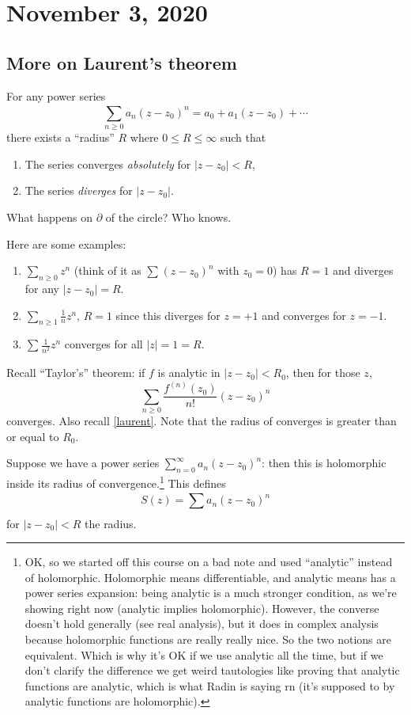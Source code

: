 \section{November 3, 2020}
\subsection{More on Laurent's theorem}
\begin{theorem}
    For any power series \[
        \sum_{n\geq 0}^{} a_n (z-z_0)^n =a_0+a_1(z-z_0)+\cdots 
    \] there exists a ``radius'' $R$ where $0\leq R\leq \infty$ such that 
    \begin{enumerate}
        \item The series converges \emph{absolutely} for $|z-z_0|<R$,
        \item The series \emph{diverges} for $|z-z_0|$.
    \end{enumerate}
\end{theorem}
What happens on $\partial $ of the circle? Who knows.
\begin{example}
    Here are some examples:
    \begin{enumerate}
        \item $\sum_{n\geq 0}^{} z^n $ (think of it as $\sum_{}^{} (z-z_0)^n $ with $z_0=0$) has $R=1$ and diverges for any $|z-z_0|=R$.
        \item $\sum_{n\geq 1}^{} \frac{1}{n}z^n ,\, R=1$ since this diverges for $z=+1$ and converges for $z=-1$.
        \item $\sum_{}^{} \frac{1}{n^2}z^n $ converges for all $|z|=1=R$.
    \end{enumerate}
\end{example}
Recall ``Taylor's'' theorem: if $f$ is analytic in $|z-z_0|<R_0$, then for those $z$, \[
    \sum_{n\geq 0}^{} \frac{f^{(n)}(z_0)}{n!}(z-z_0)^n 
\] converges. Also recall \cref{laurent}. Note that the radius of converges is greater than or equal to $R_0$.
\begin{theorem}
    Suppose we have a power series $\sum_{n=0}^{\infty} a_n (z-z_0)^n $: then this is holomorphic inside its radius of convergence.\footnote{OK, so we started off this course on a bad note and used ``analytic'' instead of holomorphic. Holomorphic means differentiable, and analytic means has a power series expansion: being analytic is a much stronger condition, as we're showing right now (analytic implies holomorphic). However, the converse doesn't hold generally (see real analysis), but it does in complex analysis because holomorphic functions are really really nice. So the two notions are equivalent. Which is why it's OK if we use analytic all the time, but if we don't clarify the difference we get weird tautologies like proving that analytic functions are analytic, which is what Radin is saying rn (it's supposed to by analytic functions are holomorphic).} This defines  \[
        S(z)=\sum_{}^{} a_n (z-z_0)^n 
    \] for $|z-z_0|<R$ the radius. 
\end{theorem}
